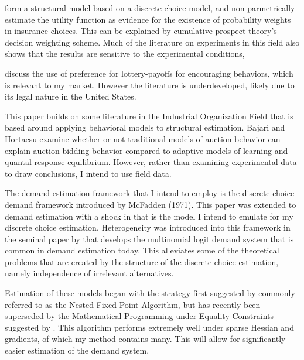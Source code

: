 \documentclass[12pt]{paper}
\begin{document}
\cite*{Barseghyan2012} form a structural model based on a discrete
choice model, and non-parmetrically estimate the utility function as
evidence for the existence of probability weights in insurance
choices. This can be explained by cumulative prospect theory's
decision weighting scheme. Much of the literature on experiments in
this field also shows that the results are sensitive to the
experimental conditions, \cite*{PlottZeiler}

\cite{LitReview} discuss the use of preference for lottery-payoffs for
encouraging behaviors, which is relevant to my market. However the
literature is underdeveloped, likely due to its legal nature in the
United States.

This paper builds on some literature in the Industrial Organization
Field that is based around applying behavioral models to structural
estimation. Bajari and Hortacsu examine whether or not traditional
models of auction behavior can explain auction bidding behavior
compared to adaptive models of learning and quantal response
equilibrium. However, rather than examining experimental data to draw
conclusions, I intend to use field data. 

The demand estimation framework that I intend to employ is the
discrete-choice demand framework introduced by McFadden (1971). This
paper was extended to demand estimation with a shock in \cite{Berry1994}
that is the model I intend to emulate for my discrete choice
estimation. Heterogeneity was introduced into this framework in the
seminal paper by \cite*{BLP} that develops the multinomial logit
demand system that is common in demand estimation today. This
alleviates some of the theoretical problems that are created by the
structure of the discrete choice estimation, namely independence of
irrelevant alternatives. 

Estimation of these models began with the strategy first suggested by
\cite{BLP} commonly referred to as the Nested Fixed Point Algorithm,
but has recently been superseded by the Mathematical Programming under
Equality Constraints suggested by \cite*{MPEC}. This algorithm
performs extremely well under sparse Hessian and gradients, of which
my method contains many. This will allow for significantly easier
estimation of the demand system.
\end{document}
